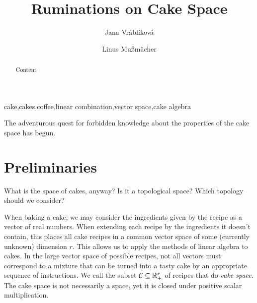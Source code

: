 \documentclass[final,3p,12pt]{elsarticle}
\begin{document}
\begin{frontmatter}

\title{Ruminations on Cake Space}

\author[jku]{Jana Vráblíková}
\author[jku]{Linus Mußmächer}
\address[jku]{Institute of Applied Geometry, Johannes Kepler University,Linz/Austria}

\begin{abstract}
  Content
\end{abstract}

\begin{keyword}
  cake\sep cakes\sep coffee\sep linear combination\sep vector space\sep cake algebra
\end{keyword}

\end{frontmatter}

The adventurous quest for forbidden knowledge about the properties of the cake space has begun.

\section{Preliminaries}
What is the space of cakes, anyway? Is it a topological space? Which topology should we consider?

When baking a cake, we may consider the ingredients given by the recipe as a vector of real numbers.
When extending each recipe by the ingredients it doesn't contain, this places all cake recipes in a common vector space of some (currently unknown) dimension $r$.
This allows us to apply the methods of linear algebra to cakes.
In the large vector space of possible recipes, not all vectors must correspond to a mixture that can be turned into a tasty cake by an appropriate sequence of instructions.
We call the subset $\mathcal{C} \subseteq \mathbb{R}_+^r$ of recipes that do \emph{cake space}.
The cake space is not necessarily a space, yet it is closed under positive scalar multiplication.
\end{document}
